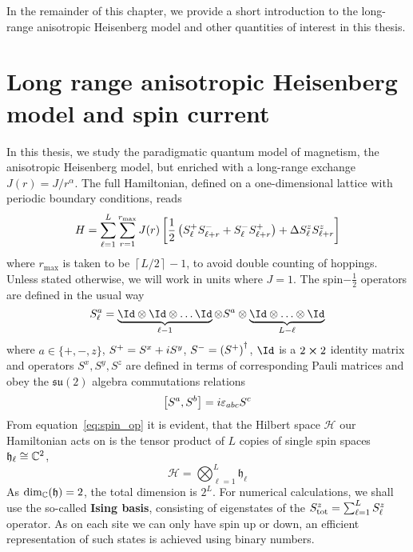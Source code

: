 In the remainder of this chapter, we provide a short introduction to the long-range anisotropic Heisenberg model
and other quantities of interest in this thesis.

\section{Long range anisotropic Heisenberg model and spin current}

In this thesis, we study the paradigmatic quantum model of magnetism, the anisotropic Heisenberg
model, but enriched with a long-range exchange \(J(r) = J/r^{\alpha}\). The full Hamiltonian,
defined on a one-dimensional lattice with periodic boundary conditions, reads
\begin{equation}
    H = \sum_{\ell=1}^{L}\sum_{r=1}^{r_{\mathrm{max}}} J(r) \left[\frac{1}{2} \left(
        S^{+}_{\ell}S^{-}_{\ell+r} + S^{-}_{\ell}S^{+}_{\ell+r}\right) + \Delta S^{z}_{\ell}S^{z}_{\ell+r}
        \right]
    \label{eq:long_range}
\end{equation}
where \(r_{\mathrm{max}}\) is taken to be \(\left\lceil L/2\right\rceil - 1 \), to avoid double counting of hoppings.
Unless stated otherwise, we will work in units where \(J = 1\).
The spin\(-\frac{1}{2}\) operators are defined in the usual way
\begin{equation}
    S_{\ell}^{a} = \underbrace{\Id \otimes \Id \otimes \ldots \Id}_{\ell-1} \otimes S^{a} \otimes \underbrace{\Id \otimes \ldots \otimes \Id}_{L-\ell}
    \label{eq:spin_op}
\end{equation}
where \(a\in\{+,-,z\}\), \(S^{+} = S^x + i S^y\), \(S^{-} = \left(S^{+}\right)^{\dagger}\),
\(\Id\) is a \(2\cross 2\) identity matrix and operators \(S^x,S^y,S^z\) are defined in terms
of corresponding Pauli matrices and obey the \(\mathfrak{su}(2)\) algebra commutations relations
\begin{equation}
    \comm{S^a}{S^b} = i \varepsilon_{abc} S^c
\end{equation}
From equation~\eqref{eq:spin_op} it is evident, that the Hilbert space \(\mathcal{H}\) our Hamiltonian acts on
is the tensor product of \(L\) copies of single spin spaces \(\mathfrak{h}_{\ell} \cong \mathbb{C}^2\),
\begin{equation}
    \mathcal{H} = \bigotimes_{\ell=1}^{L} \mathfrak{h}_{\ell}
\end{equation}
As \(\mathrm{dim_{\mathbb{C}}}(\mathfrak{h}) = 2\), the total dimension is \(2^L\).
For numerical calculations, we shall use the so-called \textbf{Ising basis}, consisting of eigenstates
of the \(S^z_{\mathrm{tot}} = \sum_{\ell=1}^{L} S^{z}_{\ell}\) operator. As on each site we can only
have spin up or down, an efficient representation of such states is achieved using binary numbers.

